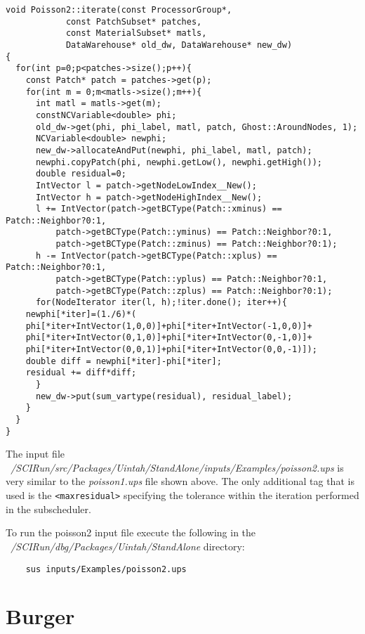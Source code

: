 \documentclass[12pt]{report}
\begin{document}
\begin{verbatim}
void Poisson2::iterate(const ProcessorGroup*,
		    const PatchSubset* patches,
		    const MaterialSubset* matls,
		    DataWarehouse* old_dw, DataWarehouse* new_dw)
{
  for(int p=0;p<patches->size();p++){
    const Patch* patch = patches->get(p);
    for(int m = 0;m<matls->size();m++){
      int matl = matls->get(m);
      constNCVariable<double> phi;
      old_dw->get(phi, phi_label, matl, patch, Ghost::AroundNodes, 1);
      NCVariable<double> newphi;
      new_dw->allocateAndPut(newphi, phi_label, matl, patch);
      newphi.copyPatch(phi, newphi.getLow(), newphi.getHigh());
      double residual=0;
      IntVector l = patch->getNodeLowIndex__New();
      IntVector h = patch->getNodeHighIndex__New(); 
      l += IntVector(patch->getBCType(Patch::xminus) == Patch::Neighbor?0:1,
		  patch->getBCType(Patch::yminus) == Patch::Neighbor?0:1,
		  patch->getBCType(Patch::zminus) == Patch::Neighbor?0:1);
      h -= IntVector(patch->getBCType(Patch::xplus) == Patch::Neighbor?0:1,
		  patch->getBCType(Patch::yplus) == Patch::Neighbor?0:1,
		  patch->getBCType(Patch::zplus) == Patch::Neighbor?0:1);
      for(NodeIterator iter(l, h);!iter.done(); iter++){
	newphi[*iter]=(1./6)*(
	phi[*iter+IntVector(1,0,0)]+phi[*iter+IntVector(-1,0,0)]+
	phi[*iter+IntVector(0,1,0)]+phi[*iter+IntVector(0,-1,0)]+
	phi[*iter+IntVector(0,0,1)]+phi[*iter+IntVector(0,0,-1)]);
	double diff = newphi[*iter]-phi[*iter];
	residual += diff*diff;
      }
      new_dw->put(sum_vartype(residual), residual_label);
    }
  }
}

\end{verbatim}

The input file
\emph{~/SCIRun/src/Packages/Uintah/StandAlone/inputs/Examples/poisson2.ups}
is very similar to the \emph{poisson1.ups} file shown above.  The only
additional tag that is used is the \texttt{<maxresidual>} specifying
the tolerance within the iteration performed in the subscheduler.

To run the poisson2 input file execute the following in the
\emph{~/SCIRun/dbg/Packages/Uintah/StandAlone} directory:

\begin{verbatim}
	sus inputs/Examples/poisson2.ups

\end{verbatim}


\section{Burger}
\end{document}
